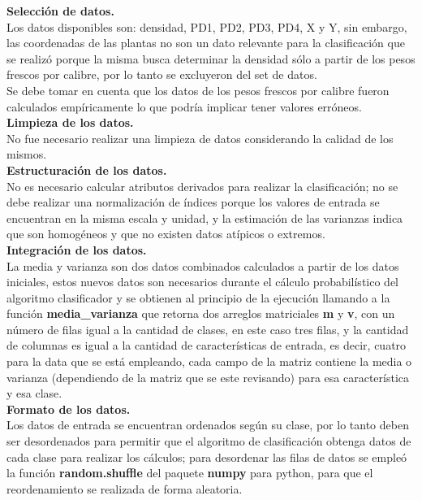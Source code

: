 \noindent
\textbf{Selección de datos.}\\

Los datos disponibles son: densidad, PD1, PD2, PD3, PD4, X y Y, sin embargo, las coordenadas de las
plantas no son un dato relevante para la clasificación que se realizó porque la misma busca determinar
la densidad sólo a partir de los pesos frescos por calibre, por lo tanto se excluyeron del set de datos.\\

Se debe tomar en cuenta que los datos de los pesos frescos por calibre fueron calculados empíricamente
lo que podría implicar tener valores erróneos.\\

\noindent
\textbf{Limpieza de los datos.}\\

No fue necesario realizar una limpieza de datos considerando la calidad de los mismos.\\

\noindent
\textbf{Estructuración de los datos.}\\

No es necesario calcular atributos derivados para realizar la clasificación; no se debe realizar
una normalización de índices porque los valores de entrada se encuentran en la misma escala y unidad, y la estimación de las varianzas indica que son homogéneos y que no existen datos atípicos o extremos.\\

\noindent
\textbf{Integración de los datos.}\\

La media y varianza son dos datos combinados calculados a partir de los datos iniciales, estos nuevos
datos son necesarios durante el cálculo probabilístico del algoritmo clasificador y se
obtienen al principio de la ejecución llamando a la función \textbf{media\_varianza} que retorna
dos arreglos matriciales \textbf{m} y \textbf{v}, con un número de filas igual a la cantidad de clases, en este caso tres filas,
y la cantidad de columnas es igual a la cantidad de características de entrada, es decir, cuatro
para la data que se está empleando, cada campo de la matriz contiene la media o varianza (dependiendo de la
matriz que se este revisando) para esa característica y esa clase.\\

\noindent
\textbf{Formato de los datos.}\\

Los datos de entrada se encuentran ordenados según su clase, por lo tanto deben ser desordenados para permitir que el algoritmo de clasificación obtenga datos de cada clase para realizar los cálculos; para desordenar las filas de datos se empleó la función \textbf{random.shuffle} del paquete \textbf{numpy} para python, para que el reordenamiento se realizada de forma aleatoria.\\


